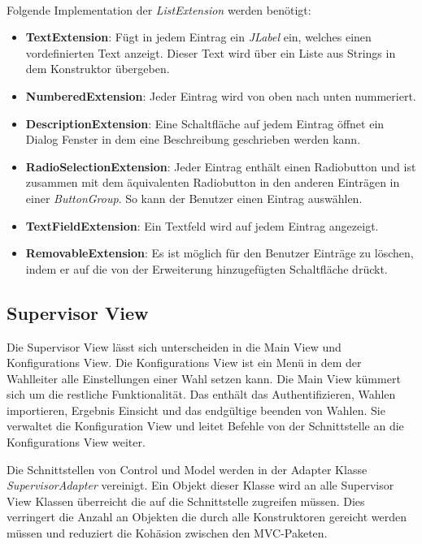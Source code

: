 \documentclass[parskip=full]{scrartcl}
\newcommand{\textitx}[1]{\mbox{\textit{#1}}}
\newcommand{\fakeparagraph}[1]{\textbf{#1}}
\begin{document}
		\\
		Folgende Implementation der \textitx{ListExtension} werden benötigt:
		\begin{itemize}
			\item\fakeparagraph{TextExtension}: Fügt in jedem Eintrag ein \textitx{JLabel} ein, welches einen vordefinierten Text anzeigt. Dieser Text wird über ein Liste aus Strings in dem Konstruktor übergeben.
			\item\fakeparagraph{NumberedExtension}: Jeder Eintrag wird von oben nach unten nummeriert.
			\item\fakeparagraph{DescriptionExtension}: Eine Schaltfläche auf jedem Eintrag öffnet ein Dialog Fenster in dem eine Beschreibung geschrieben werden kann.
			\item\fakeparagraph{RadioSelectionExtension}: Jeder Eintrag enthält einen Radiobutton und ist zusammen mit dem äquivalenten Radiobutton in den anderen Einträgen in einer \textitx{ButtonGroup}. So kann der Benutzer einen Eintrag auswählen.
			\item\fakeparagraph{TextFieldExtension}: Ein Textfeld wird auf jedem Eintrag angezeigt.
			\item\fakeparagraph{RemovableExtension}: Es ist möglich für den Benutzer Einträge zu löschen, indem er auf die von der Erweiterung hinzugefügten Schaltfläche drückt.
		\end{itemize}
	
		\subsection{Supervisor View}
		Die Supervisor View lässt sich unterscheiden in die Main View und Konfigurations View. Die Konfigurations View ist ein Menü in dem der Wahlleiter alle Einstellungen einer Wahl setzen kann. Die Main View kümmert sich um die restliche Funktionalität. Das enthält das Authentifizieren, Wahlen importieren, Ergebnis Einsicht und das endgültige beenden von Wahlen. Sie verwaltet die Konfiguration View und leitet Befehle von der Schnittstelle an die Konfigurations View weiter.
		
		Die Schnittstellen von Control und Model werden in der Adapter Klasse \textitx{SupervisorAdapter} vereinigt. Ein Objekt dieser Klasse wird an alle Supervisor View Klassen überreicht die auf die Schnittstelle zugreifen müssen. Dies verringert die Anzahl an Objekten die durch alle Konstruktoren gereicht werden müssen und reduziert die Kohäsion zwischen den MVC-Paketen.
		
\end{document}
